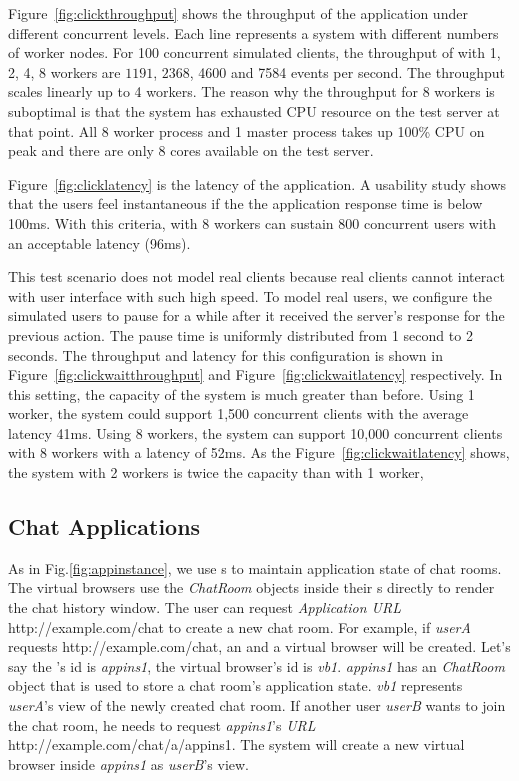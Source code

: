 \clickthroughput{}

Figure~\ref{fig:clickthroughput} shows the throughput of the application 
under different concurrent levels.
Each line represents a \cb{} system with different numbers of worker nodes.
For 100 concurrent simulated clients, 
the throughput of \cb{} with 1, 2, 4, 8 workers are $1191$, $2368$, 4600 and 7584 events
per second.
The throughput scales linearly up to 4 workers.
The reason why the throughput for 8 workers is suboptimal is that the
system has exhausted CPU resource on the test server at that point.
All 8 worker process and 1 master process takes up 100\% CPU on peak and there are
only 8 cores available on the test server.

\clicklatency{}

Figure~\ref{fig:clicklatency} is the latency of the application.
A usability study shows that the users feel instantaneous if the 
the application response time is below 100ms.
With this criteria,
\cb{} with 8 workers can sustain 800 concurrent users with an acceptable latency (96ms).

This test scenario does not model real clients because real clients cannot 
interact with user interface with such high speed.
To model real users, we configure the simulated users to pause for a while
after it received the server's response for the previous action.
The pause time is uniformly distributed from 1 second to 2 seconds.
The throughput and latency for this configuration is shown 
in Figure~\ref{fig:clickwaitthroughput} and Figure~\ref{fig:clickwaitlatency} respectively.
In this setting, the capacity of the system is much greater than before.
Using 1 worker, the system could support 1,500 concurrent clients with the average latency 41ms.
Using 8 workers, 
the system can support 10,000 concurrent clients with 8 workers with a latency of 52ms.
As the Figure~\ref{fig:clickwaitlatency} shows, 
the system with 2 workers is twice the capacity than with 1 worker,



\clickwaitthroughput{}
\clickwaitlatency{}

\subsection{Chat Applications}
As in Fig.\ref{fig:appinstance},
we use \appins{}s to maintain application state of chat rooms.
The virtual browsers use the \emph{ChatRoom} objects inside their \appins{}s 
directly to render the chat history window.
The user can request \emph{Application URL} http://example.com/chat
to create a new chat room.
For example, if 
\emph{userA} requests http://example.com/chat,
an \appins{} and a virtual browser will be created.
Let's say the \appins{}'s id is \emph{appins1},
the virtual browser's id is \emph{vb1}.
\emph{appins1} has an \emph{ChatRoom} object that is used to store 
a chat room's application state.
\emph{vb1} represents \emph{userA}'s view of the newly created
chat room.
If another user \emph{userB} wants to join the chat room, 
he needs to request \emph{appins1}'s \emph{\appins{} URL} 
http://example.com/chat/a/appins1.
The system will create a new virtual browser inside \emph{appins1}
as \emph{userB}'s view.


